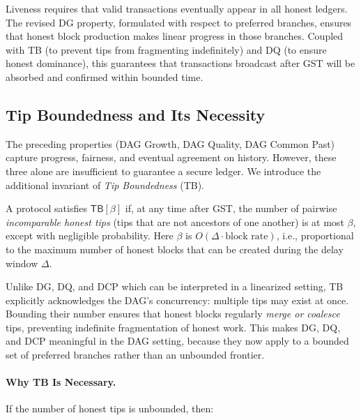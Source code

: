 \begin{remark}
Liveness requires that valid transactions eventually appear in all honest ledgers. 
The revised DG property, formulated with respect to preferred branches, 
ensures that honest block production makes linear progress in those branches. 
Coupled with TB (to prevent tips from fragmenting indefinitely) 
and DQ (to ensure honest dominance), this guarantees that transactions 
broadcast after GST will be absorbed and confirmed within bounded time. 
\end{remark}








\subsection{Tip Boundedness and Its Necessity}
\label{subsec:tip-boundedness}

The preceding properties (DAG Growth, DAG Quality, DAG Common Past) capture
progress, fairness, and eventual agreement on history. However, these three
alone are insufficient to guarantee a secure ledger. We introduce the additional
invariant of \emph{Tip Boundedness} (TB).

\begin{definition}
A protocol satisfies $\mathsf{TB}[\beta]$ if, at any time after GST, the number
of pairwise \emph{incomparable honest tips} (tips that are not ancestors of one
another) is at most $\beta$, except with negligible probability. Here $\beta$ is
$O(\Delta \cdot \text{block rate})$, i.e., proportional to the maximum number of
honest blocks that can be created during the delay window $\Delta$.
\end{definition}

\begin{remark}
Unlike DG, DQ, and DCP which can be interpreted in a linearized setting,
TB explicitly acknowledges the DAG’s concurrency: multiple tips may
exist at once. Bounding their number ensures that honest blocks regularly
\emph{merge or coalesce} tips, preventing indefinite fragmentation of honest
work. This makes DG, DQ, and DCP meaningful in the DAG setting, because they
now apply to a bounded set of preferred branches rather than an unbounded
frontier.
\end{remark}

\paragraph{Why TB Is Necessary.}
If the number of honest tips is unbounded, then:

